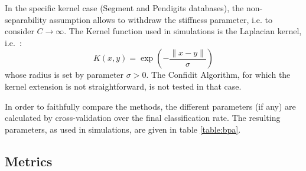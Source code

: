 \documentclass[preprint,12pt,authoryear]{elsarticle}
\begin{document}




In the specific kernel case (Segment and Pendigits databases), the non-separability assumption allows to withdraw the stiffness parameter, i.e. to consider $C \rightarrow \infty$. The Kernel function used in simulations is the Laplacian kernel, i.e.~:
\[K(x,y) = \exp{\left(-\frac{\parallel{x-y}\parallel}{\sigma}\right)}\]
whose radius is set by parameter $\sigma > 0$.
The Confidit Algorithm, for which the kernel extension is not straightforward, is not tested in that case.


In order to faithfully compare the methods, the different parameters (if any) are calculated by cross-validation over the final classification rate. The resulting parameters, as used in simulations, are given in table \ref{table:bpa}. 

\subsection{Metrics}

\end{document}
